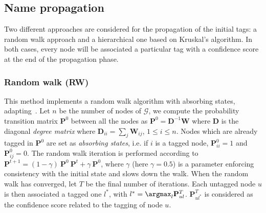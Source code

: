 \subsection{Name propagation}

Two different approaches are considered for the propagation of the initial tags: a random walk approach and a hierarchical one based on Kruskal's algorithm. In both cases, every node will be associated a particular tag with a confidence score at the end of the propagation phase.

\subsubsection{Random walk (RW)}

This method implements a random walk algorithm with absorbing states, adapting~\cite{zhu2002}. Let $n$ be the number of nodes of $\mathcal{G}$, we compute the probability transition matrix $\mathbf{P}^0$ between all the nodes as $\mathbf{P}^0 = \mathbf{D}^{-1}\mathbf{W}$ where $\mathbf{D}$ is the diagonal {\it degree matrix} where $\mathbf{D}_{ii} = \sum_j \mathbf{W}_{ij}$, $1\leq i \leq n$. Nodes which are already tagged in $\mathbf{P}^0$ are set as \textit{absorbing states}, i.e. if $i$ is a tagged node, $\mathbf{P}^0_{ii} = 1$ and $\mathbf{P}^0_{ij} = 0$. The random walk iteration is performed according to $\mathbf{P}^{t+1} = (1-\gamma) ~\mathbf{P}^0 ~ \mathbf{P}^{t} + \gamma ~\mathbf{P}^0$, where $\gamma$ (here $\gamma = 0.5$) is a parameter enforcing consistency with the initial state and slows down the walk. When the random walk has converged, let $T$ be the final number of iterations. Each untagged node $u$ is then associated a tagged one $l^*$, with $l^*=\argmax_l{\mathbf{P}^{T}_{ul}}$. $\mathbf{P}^{T}_{ul^*}$ is considered as the confidence score related to the tagging of node $u$.

